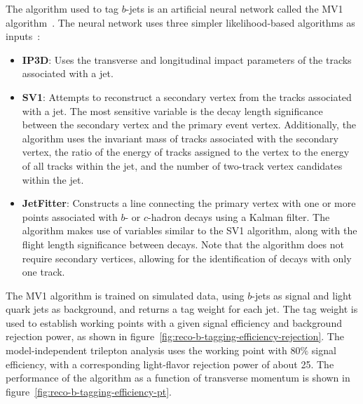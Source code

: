 The algorithm used to tag $b$-jets is an artificial neural network called the MV1 algorithm~\cite{TheATLASCollaboration:2014vj}. The neural network uses three simpler likelihood-based algorithms as inputs~\cite{TheATLASCollaboration:2009ut,TheATLASCollaboration:2011wh}: 

\begin{itemize}
	\item \textbf{IP3D}: Uses the transverse and longitudinal impact parameters of the tracks associated with a jet.
	\item \textbf{SV1}: Attempts to reconstruct a secondary vertex from the tracks associated with a jet. The most sensitive variable is the decay length significance between the secondary vertex and the primary event vertex. Additionally, the algorithm uses the invariant mass of tracks associated with the secondary vertex, the ratio of the energy of tracks assigned to the vertex to the energy of all tracks within the jet, and the number of two-track vertex candidates within the jet. 
	\item \textbf{JetFitter}: Constructs a line connecting the primary vertex with one or more points associated with $b$- or $c$-hadron decays using a Kalman filter. The algorithm makes use of variables similar to the SV1 algorithm, along with the flight length significance between decays. Note that the algorithm does not require secondary vertices, allowing for the identification of decays with only one track. 
\end{itemize}

The MV1 algorithm is trained on simulated data, using $b$-jets as signal and light quark jets as background, and returns a tag weight for each jet. The tag weight is used to establish working points with a given signal efficiency and background rejection power, as shown in figure~\ref{fig:reco-b-tagging-efficiency-rejection}. The model-independent trilepton analysis uses the working point with $80\%$ signal efficiency, with a corresponding light-flavor rejection power of about 25. The performance of the algorithm as a function of transverse momentum is shown in figure~\ref{fig:reco-b-tagging-efficiency-pt}.

